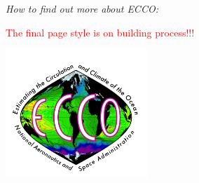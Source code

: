 \pagebreak 
\centering
\emph{\color{MidnightBlue} \Huge How to find out more about ECCO:}
\newp

\begin{center}
    \textcolor{red}{\Large{The final page style is on building process!!!}}
\end{center}




\includegraphics[width=0.4\textwidth]{../images/ecco_logo_800_726.png}


